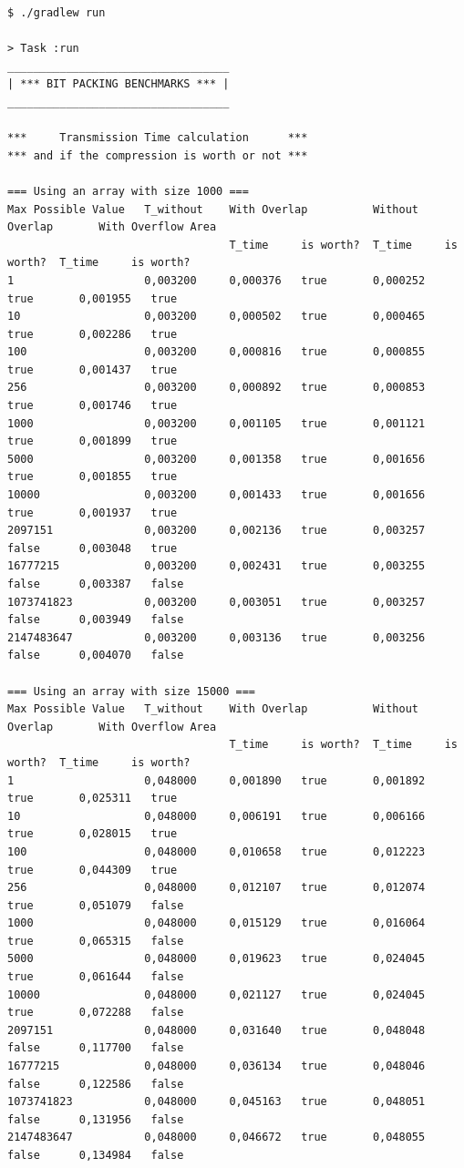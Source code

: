 \documentclass[titlepage]{article}
\begin{document}
{\lstset{basicstyle=\scriptsize\ttfamily}
\begin{lstlisting}
$ ./gradlew run

> Task :run
__________________________________
| *** BIT PACKING BENCHMARKS *** |
__________________________________

***     Transmission Time calculation      ***
*** and if the compression is worth or not ***

=== Using an array with size 1000 ===
Max Possible Value   T_without    With Overlap          Without Overlap       With Overflow Area   
                                  T_time     is worth?  T_time     is worth?  T_time     is worth? 
1                    0,003200     0,000376   true       0,000252   true       0,001955   true      
10                   0,003200     0,000502   true       0,000465   true       0,002286   true      
100                  0,003200     0,000816   true       0,000855   true       0,001437   true      
256                  0,003200     0,000892   true       0,000853   true       0,001746   true      
1000                 0,003200     0,001105   true       0,001121   true       0,001899   true      
5000                 0,003200     0,001358   true       0,001656   true       0,001855   true      
10000                0,003200     0,001433   true       0,001656   true       0,001937   true      
2097151              0,003200     0,002136   true       0,003257   false      0,003048   true      
16777215             0,003200     0,002431   true       0,003255   false      0,003387   false     
1073741823           0,003200     0,003051   true       0,003257   false      0,003949   false     
2147483647           0,003200     0,003136   true       0,003256   false      0,004070   false     

=== Using an array with size 15000 ===
Max Possible Value   T_without    With Overlap          Without Overlap       With Overflow Area   
                                  T_time     is worth?  T_time     is worth?  T_time     is worth? 
1                    0,048000     0,001890   true       0,001892   true       0,025311   true      
10                   0,048000     0,006191   true       0,006166   true       0,028015   true      
100                  0,048000     0,010658   true       0,012223   true       0,044309   true      
256                  0,048000     0,012107   true       0,012074   true       0,051079   false     
1000                 0,048000     0,015129   true       0,016064   true       0,065315   false     
5000                 0,048000     0,019623   true       0,024045   true       0,061644   false     
10000                0,048000     0,021127   true       0,024045   true       0,072288   false     
2097151              0,048000     0,031640   true       0,048048   false      0,117700   false     
16777215             0,048000     0,036134   true       0,048046   false      0,122586   false     
1073741823           0,048000     0,045163   true       0,048051   false      0,131956   false     
2147483647           0,048000     0,046672   true       0,048055   false      0,134984   false     


\end{lstlisting}}
\end{document}
